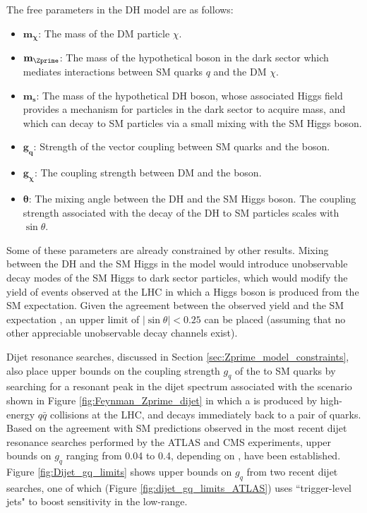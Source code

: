 The free parameters in the DH model are as follows:

\begin{itemize}
\item \(\mathbf{m_\chi}\): The mass of the DM particle \(\chi\).
\item \(\mathbf{m_{\Zprime}}\): The mass of the hypothetical \Zprime boson in the dark sector which mediates interactions between SM quarks \(q\) and the DM \(\chi\).
\item \(\mathbf{m_s}\): The mass of the hypothetical DH boson, whose associated Higgs field provides a mechanism for particles in the dark sector to acquire mass, and which can decay to SM particles via a small mixing with the SM Higgs boson.
\item \(\mathbf{g_q}\): Strength of the vector coupling between SM quarks and the \Zprime boson.
\item \(\mathbf{g_\chi}\): The coupling strength between DM and the \Zprime boson.
\item \(\mathbf{\theta}\): The mixing angle between the DH and the SM Higgs boson. The coupling strength associated with the decay of the DH to SM particles scales with \(\sin\theta\).
\end{itemize}

Some of these parameters are already constrained by other results. Mixing between the DH and the SM Higgs in the model would introduce unobservable decay modes of the SM Higgs to dark sector particles, which would modify the yield of events observed at the LHC in which a Higgs boson is produced from the SM expectation. Given the agreement between the observed yield and the SM expectation \cite{ATLAS-CONF-2020-027,CMS-PAS-HIG-19-005}, an upper limit of \(|\sin\theta| < 0.25\) can be placed \cite{Collider_searches_2021} (assuming that no other appreciable unobservable decay channels exist).

Dijet resonance searches, discussed in Section \ref{sec:Zprime_model_constraints}, also place upper bounds on the coupling strength \(g_q\) of the \Zprime to SM quarks by searching for a resonant peak in the dijet spectrum associated with the scenario shown in Figure \ref{fig:Feynman_Zprime_dijet} in which a \Zprime is produced by high-energy \(q\bar{q}\) collisions at the LHC, and decays immediately back to a pair of quarks. Based on the agreement with SM predictions observed in the most recent dijet resonance searches performed by the ATLAS and CMS experiments, \cite{dijet_1,dijet_2,dijet_3,dijet_4} upper bounds on \(g_q\) ranging from 0.04 to 0.4, depending on \mZp, have been established. Figure \ref{fig:Dijet_gq_limits} shows upper bounds on \(g_q\) from two recent dijet searches, one of which (Figure \ref{fig:dijet_gq_limits_ATLAS}) uses ``trigger-level jets" \cite{dijet_2} to boost sensitivity in the low-\mZp range. 

